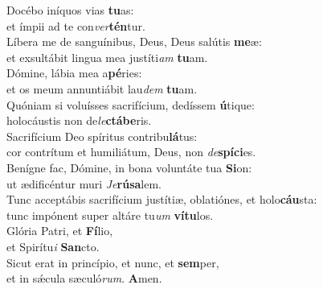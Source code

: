 \evenverse Docébo iníquos vias \textbf{tu}as:~\*\\
\evenverse et ímpii ad te con\textit{ver}\textbf{tén}tur.\\
\oddverse Líbera me de sanguínibus, Deus, Deus salútis \textbf{me}æ:~\*\\
\oddverse et exsultábit lingua mea justíti\textit{am} \textbf{tu}am.\\
\evenverse Dómine, lábia mea a\textbf{pé}ries:~\*\\
\evenverse et os meum annuntiábit lau\textit{dem} \textbf{tu}am.\\
\oddverse Quóniam si voluísses sacrifícium, dedíssem \textbf{ú}tique:~\*\\
\oddverse holocáustis non de\textit{le}\textbf{ctá}\textbf{be}ris.\\
\evenverse Sacrifícium Deo spíritus contribu\textbf{lá}tus:~\*\\
\evenverse cor contrítum et humiliátum, Deus, non \textit{de}\textbf{spí}\textbf{ci}es.\\
\oddverse Benígne fac, Dómine, in bona voluntáte tua \textbf{Si}on:~\*\\
\oddverse ut ædificéntur muri \textit{Je}\textbf{rú}\textbf{sa}lem.\\
\evenverse Tunc acceptábis sacrifícium justítiæ, oblatiónes, et holo\textbf{cáu}sta:~\*\\
\evenverse tunc impónent super altáre tu\textit{um} \textbf{ví}\textbf{tu}los.\\
\oddverse Glória Patri, et \textbf{Fí}lio,~\*\\
\oddverse et Spirítu\textit{i} \textbf{San}cto.\\
\evenverse Sicut erat in princípio, et nunc, et \textbf{sem}per,~\*\\
\evenverse et in sǽcula sæculó\textit{rum}. \textbf{A}men.\\
